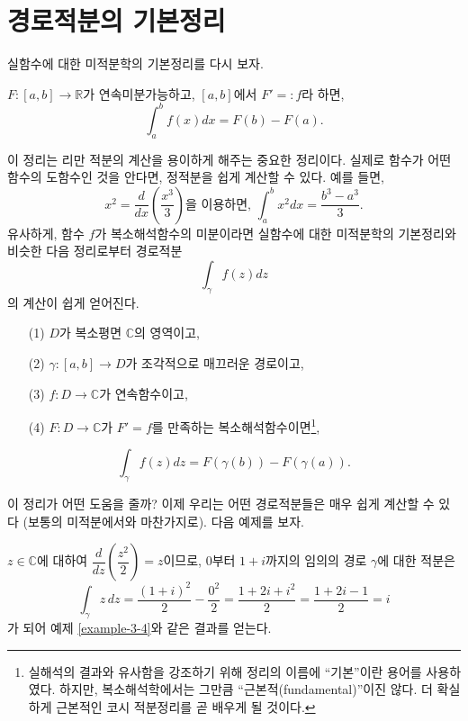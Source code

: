 \section{경로적분의 기본정리}

실함수에 대한 미적분학의 기본정리를 다시 보자.
\begin{salttheorem}{}{} \label{thm-3-2}
$F:[a,b] \to \mathbb R$가 연속미분가능하고, 
$[a,b]$에서 $F'=:f$라 하면,
\[
\int_a^b f(x)dx = F(b) - F(a).
\]
\end{salttheorem}

이 정리는 리만 적분의 계산을 용이하게 해주는 중요한 정리이다. 
실제로 함수가 어떤 함수의 도함수인 것을 안다면, 정적분을 쉽게 계산할 수 있다.
예를 들면,
\[
x^2 = \dfrac d{dx}\left( \dfrac{x^3}3\right) \text{을 이용하면, }
\int_a^b x^2 dx = \dfrac{b^3-a^3}3.
\]
유사하게,  함수 $f$가 복소해석함수의 미분이라면 
실함수에 대한 미적분학의 기본정리와 비슷한 다음 정리로부터 
경로적분
\[
\int_\gamma f(z)dz
\]
의 계산이 쉽게 얻어진다.


\begin{salttheorem}  {}{}
\label{thm-3-3}
\begin{itemize}
\item[(1)] $D$가 복소평면 $\mathbb C$의 영역이고,
\item[(2)] $\gamma : [a,b] \to D$가 조각적으로 매끄러운 경로이고,
\item[(3)] $f:D\to\mathbb C$가  연속함수이고,
\item[(4)] $F:D\to \mathbb C$가   $F'=f$를 만족하는 
복소해석함수이면\footnote{실해석의 결과와 유사함을 강조하기 위해  정리의 이름에
``기본''이란 용어를 사용하였다. 하지만, 복소해석학에서는
그만큼 ``근본적(fundamental)''이진 않다. 
더 확실하게 근본적인 코시 적분정리를 곧 배우게 될 것이다. },
\end{itemize}
\[
\int_\gamma f(z)dz = F(\gamma(b)) - F(\gamma(a)).
\]
\end{salttheorem}

이 정리가 어떤 도움을 줄까?
이제 우리는 어떤 경로적분들은 매우 쉽게 계산할 수 있다
(보통의 미적분에서와 마찬가지로).
다음 예제를 보자.

\begin{saltexample}[label=example-3-5]{}{}
$z\in\mathbb C$에 대하여
$\dfrac d{dz}\left( \dfrac{z^2}2\right)=z$이므로,
$0$부터 $1+i$까지의 임의의 경로 $\gamma$에 대한 적분은
\[
\int_\gamma z\, dz = \dfrac{(1+i)^2}2 - \dfrac{0^2}2 
= \dfrac{1+2i+i^2}2 = \dfrac{1+2i-1}2 = i
\]
가 되어 예제 \ref{example-3-4}와 같은 결과를 얻는다.
\end{saltexample}


